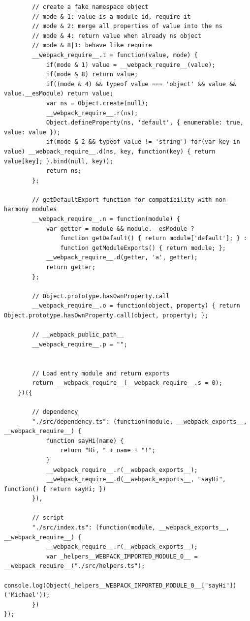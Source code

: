 \begin{lstlisting}
        // create a fake namespace object
        // mode & 1: value is a module id, require it
        // mode & 2: merge all properties of value into the ns
        // mode & 4: return value when already ns object
        // mode & 8|1: behave like require
        __webpack_require__.t = function(value, mode) {
            if(mode & 1) value = __webpack_require__(value);
            if(mode & 8) return value;
            if((mode & 4) && typeof value === 'object' && value && value.__esModule) return value;
            var ns = Object.create(null);
            __webpack_require__.r(ns);
            Object.defineProperty(ns, 'default', { enumerable: true, value: value });
            if(mode & 2 && typeof value != 'string') for(var key in value) __webpack_require__.d(ns, key, function(key) { return value[key]; }.bind(null, key));
            return ns;
        };
    
        // getDefaultExport function for compatibility with non-harmony modules
        __webpack_require__.n = function(module) {
            var getter = module && module.__esModule ?
                function getDefault() { return module['default']; } :
                function getModuleExports() { return module; };
            __webpack_require__.d(getter, 'a', getter);
            return getter;
        };
    
        // Object.prototype.hasOwnProperty.call
        __webpack_require__.o = function(object, property) { return Object.prototype.hasOwnProperty.call(object, property); };
    
        // __webpack_public_path__
        __webpack_require__.p = "";
    
    
        // Load entry module and return exports
        return __webpack_require__(__webpack_require__.s = 0);
    })({
    
        // dependency
        "./src/dependency.ts": (function(module, __webpack_exports__, __webpack_require__) {
            function sayHi(name) {
                return "Hi, " + name + "!";
            }
            __webpack_require__.r(__webpack_exports__);
            __webpack_require__.d(__webpack_exports__, "sayHi", function() { return sayHi; })
        }),
    
        // script 
        "./src/index.ts": (function(module, __webpack_exports__, __webpack_require__) {
            __webpack_require__.r(__webpack_exports__);
            var _helpers__WEBPACK_IMPORTED_MODULE_0__ = __webpack_require__("./src/helpers.ts");
            console.log(Object(_helpers__WEBPACK_IMPORTED_MODULE_0__["sayHi"])('Michael'));
        })
});
\end{lstlisting}


